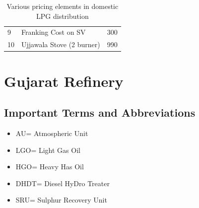 \documentclass{report}
\begin{document}
\begin{table}[H]
\begin{tabular}{@{}lll@{}}
			9               & Franking Cost on SV                                                                           & 300                                                                                                        \\
			10              & Ujjawala Stove (2 burner)                                                                     & 990                                                                                                        \\ \bottomrule
		\end{tabular}
		\caption{Various pricing elements in domestic LPG distribution}
		\label{lpg_price}
	\end{table}
	\chapter{Gujarat Refinery}
	\section{Important Terms and Abbreviations}
	\begin{itemize}
		\item AU= Atmospheric Unit
		\item LGO= Light Gas Oil
		\item HGO= Heavy Has Oil
		\item DHDT= Diesel HyDro Treater
		\item SRU= Sulphur Recovery Unit
	\end{itemize}
\end{document}
